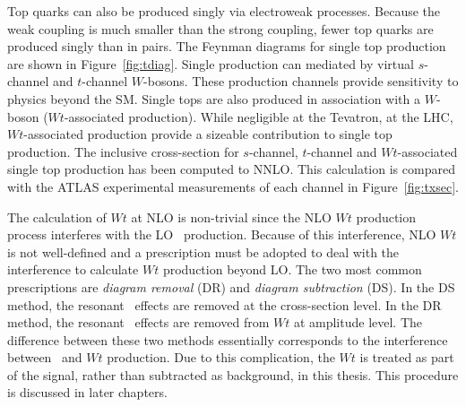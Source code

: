 Top quarks can also be produced singly via electroweak processes. Because the weak coupling is much smaller than the strong coupling, fewer top quarks are produced singly than in pairs. The Feynman diagrams for single top production are shown in Figure~\ref{fig:tdiag}. Single production can mediated by virtual $s$-channel and $t$-channel $W$-bosons. These production channels provide sensitivity to physics beyond the SM. Single tops are also produced in association with a $W$-boson ($Wt$-associated production). While negligible at the Tevatron, at the LHC, $Wt$-associated production provide a sizeable contribution to single top production. The inclusive cross-section for $s$-channel, $t$-channel and $Wt$-associated single top production has been computed to NNLO. This calculation is compared with the ATLAS experimental measurements of each channel in Figure~\ref{fig:txsec}.

The calculation of $Wt$ at NLO is non-trivial since the NLO $Wt$ production process interferes with the LO \ttbar\ production\cite{White:2009yt}. Because of this interference, NLO $Wt$ is not well-defined and a prescription must be adopted to deal with the interference to calculate $Wt$ production beyond LO. The two most common prescriptions are \emph{diagram removal} (DR) and \emph{diagram subtraction} (DS). In the DS method, the resonant \ttbar\ effects are removed at the cross-section level.  In the DR method, the resonant \ttbar\ effects are removed from $Wt$ at amplitude level. The difference between these two methods essentially corresponds to the interference between \ttbar\ and $Wt$ production. Due to this complication, the $Wt$ is treated as part of the signal, rather than subtracted as background, in this thesis. This procedure is discussed in later chapters.



